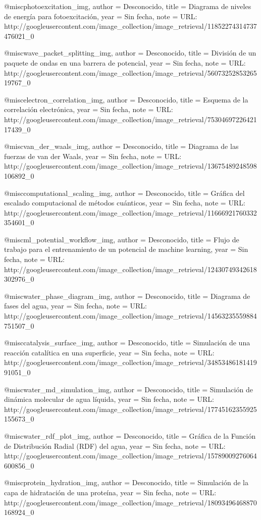@misc{photoexcitation_img,
  author = {{Desconocido}},
  title  = {Diagrama de niveles de energ\'{i}a para fotoexcitaci\'{o}n},
  year   = {{Sin fecha}},
  note   = {URL: http://googleusercontent.com/image_collection/image_retrieval/11852274314737476021_0}
}

@misc{wave_packet_splitting_img,
  author = {{Desconocido}},
  title  = {Divisi\'{o}n de un paquete de ondas en una barrera de potencial},
  year   = {{Sin fecha}},
  note   = {URL: http://googleusercontent.com/image_collection/image_retrieval/5607325285326519767_0}
}

@misc{electron_correlation_img,
  author = {{Desconocido}},
  title  = {Esquema de la correlaci\'{o}n electr\'{o}nica},
  year   = {{Sin fecha}},
  note   = {URL: http://googleusercontent.com/image_collection/image_retrieval/7530469722642117439_0}
}

@misc{van_der_waals_img,
  author = {{Desconocido}},
  title  = {Diagrama de las fuerzas de van der Waals},
  year   = {{Sin fecha}},
  note   = {URL: http://googleusercontent.com/image_collection/image_retrieval/13675489248598106892_0}
}

@misc{computational_scaling_img,
  author = {{Desconocido}},
  title  = {Gr\'{a}fica del escalado computacional de m\'{e}todos cu\'{a}nticos},
  year   = {{Sin fecha}},
  note   = {URL: http://googleusercontent.com/image_collection/image_retrieval/11666921760332354601_0}
}

@misc{ml_potential_workflow_img,
  author = {{Desconocido}},
  title  = {Flujo de trabajo para el entrenamiento de un potencial de machine learning},
  year   = {{Sin fecha}},
  note   = {URL: http://googleusercontent.com/image_collection/image_retrieval/12430749342618302976_0}
}

@misc{water_phase_diagram_img,
  author = {{Desconocido}},
  title  = {Diagrama de fases del agua},
  year   = {{Sin fecha}},
  note   = {URL: http://googleusercontent.com/image_collection/image_retrieval/14563235559884751507_0}
}

@misc{catalysis_surface_img,
  author = {{Desconocido}},
  title  = {Simulaci\'{o}n de una reacci\'{o}n catal\'{i}tica en una superficie},
  year   = {{Sin fecha}},
  note   = {URL: http://googleusercontent.com/image_collection/image_retrieval/3485348618141991051_0}
}

@misc{water_md_simulation_img,
  author = {{Desconocido}},
  title  = {Simulaci\'{o}n de din\'{a}mica molecular de agua l\'{i}quida},
  year   = {{Sin fecha}},
  note   = {URL: http://googleusercontent.com/image_collection/image_retrieval/17745162355925155673_0}
}

@misc{water_rdf_plot_img,
  author = {{Desconocido}},
  title  = {Gr\'{a}fica de la Funci\'{o}n de Distribuci\'{o}n Radial (RDF) del agua},
  year   = {{Sin fecha}},
  note   = {URL: http://googleusercontent.com/image_collection/image_retrieval/15789009276064600856_0}
}

@misc{protein_hydration_img,
  author = {{Desconocido}},
  title  = {Simulaci\'{o}n de la capa de hidrataci\'{o}n de una prote\'{i}na},
  year   = {{Sin fecha}},
  note   = {URL: http://googleusercontent.com/image_collection/image_retrieval/18093496468870168924_0}
}
